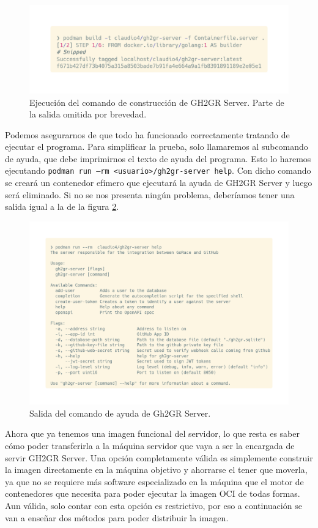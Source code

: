 \begin{figure}[H]
    \centering
    \includegraphics[width=0.75\linewidth]{images/build-server.png}
    \caption{Ejecución del comando de construcción de GH2GR Server. Parte de la salida omitida por brevedad.}
    \label{fig:build-server}
\end{figure}

Podemos asegurarnos de que todo ha funcionado correctamente tratando de ejecutar el programa. Para simplificar la prueba, solo llamaremos al subcomando de ayuda, que debe imprimirnos el texto de ayuda del programa. Esto lo haremos ejecutando \texttt{podman run --rm <usuario>/gh2gr-server help}. Con dicho comando se creará un contenedor efímero que ejecutará la ayuda de GH2GR Server y luego será eliminado. Si no se nos presenta ningún problema, deberíamos tener una salida igual a la de la figura \ref{fig:server-help}.


\begin{figure}
    \centering
    \includegraphics[width=0.75\linewidth]{images/server-help.png}
    \caption{Salida del comando de ayuda de Gh2GR Server.}
    \label{fig:server-help}
\end{figure}

Ahora que ya tenemos una imagen funcional del servidor, lo que resta es saber cómo poder transferirla a la máquina servidor que vaya a ser la encargada de servir GH2GR Server. Una opción completamente válida es simplemente construir la imagen directamente en la máquina objetivo y ahorrarse el tener que moverla, ya que no se requiere más software especializado en la máquina que el motor de contenedores que necesita para poder ejecutar la imagen OCI de todas formas. Aun válida, solo contar con esta opción es restrictivo, por eso a continuación se van a enseñar dos métodos para poder distribuir la imagen.

